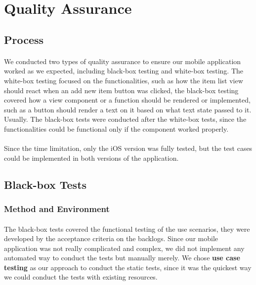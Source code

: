 \documentclass[12pt,a4paper]{article}
\begin{document}
    \section{Quality Assurance} %
      \label{chapter:Quality Assurance}
      
      \subsection{Process} %
        \paragraph{} We conducted two types of quality assurance to ensure our mobile application worked as we expected, including black-box testing and white-box testing. The white-box testing focused on the functionalities, such as how the item list view should react when an add new item button was clicked, the black-box testing covered how a view component or a function should be rendered or implemented, such as a button should render a text on it based on what text state passed to it. Usually. The black-box tests were conducted after the white-box tests, since the functionalities could be functional only if the component worked properly. 

        \paragraph{} Since the time limitation, only the iOS version was fully tested, but the test cases could be implemented in both versions of the application.

      \subsection{Black-box Tests}
        \subsubsection{Method and Environment} %
          \paragraph{} The black-box tests covered the functional testing of the use scenarios, they were developed by the acceptance criteria on the backlogs. Since our mobile application was not really complicated and complex, we did not implement any automated way to conduct the tests but manually merely. We chose {\bf use case testing} as our approach to conduct the static tests, since it was the quickest way we could conduct the tests with existing resources.
          
\end{document}
